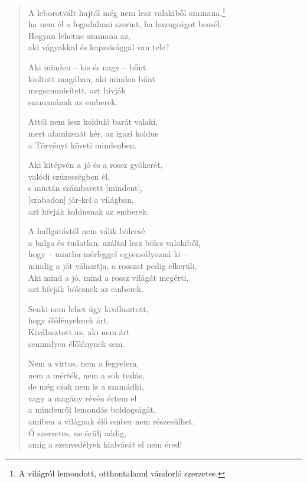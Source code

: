 \begin{verse}
 A leborotvált hajtól még nem lesz valakiből szamana,\footnote{A világról lemondott, otthontalanul vándorló szerzetes.}\\
ha nem él a fogadalmai szerint, ha hazugságot beszél.\\
Hogyan lehetne szamana az,\\
aki vágyakkal és kapzsisággal van tele?

 Aki minden – kis és nagy – bűnt\\
kioltott magában, aki minden bűnt\\
megsemmisített, azt hívják\\
szamanának az emberek.

 Attól nem lesz kolduló barát valaki,\\
mert alamizsnát kér, az igazi koldus\\
a Törvényt követi mindenben.

 Aki kitépvén a jó és a rossz gyökerét,\\
valódi szüzességben él,\\
s miután számbavett [mindent],\\
{[}szabadon] jár-kel a világban,\\
azt hívják koldusnak az emberek.

 A hallgatástól nem válik bölccsé\\
a balga és tudatlan; azáltal lesz bölcs valakiből,\\
hogy – mintha mérleggel egyensúlyozná ki –\\
mindig a jót választja, a rosszat pedig elkerüli.\\
Aki mind a jó, mind a rossz világát megérti,\\
azt hívják bölcsnek az emberek.

 Senki nem lehet úgy kiválasztott,\\
hogy élőlényeknek árt.\\
Kiválasztott az, aki nem árt\\
semmilyen élőlénynek sem.

 Nem a virtus, nem a fegyelem,\\
nem a mérték, nem a sok tudás,\\
de még csak nem is a szamádhi,\\
vagy a magány révén értem el\\
a mindenről lemondás boldogságát,\\
amiben a világnak élő ember nem részesülhet.\\
Ó szerzetes, ne örülj addig,\\
amíg a szenvedélyek kialvását el nem éred!

\end{verse}
